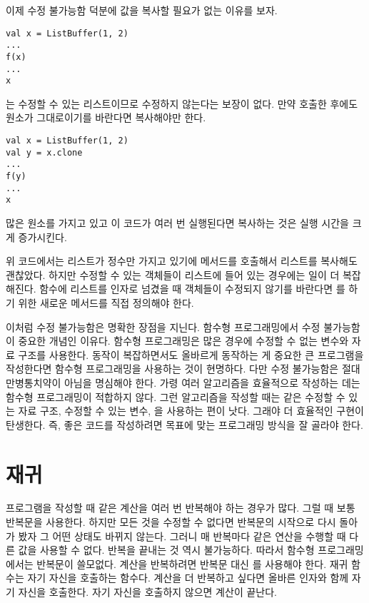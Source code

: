 이제 수정 불가능함 덕분에 값을 복사할 필요가 없는 이유를 보자.

\begin{verbatim}
val x = ListBuffer(1, 2)
...
f(x)
...
x
\end{verbatim}

는 수정할 수 있는 리스트이므로   수정하지 않는다는 보장이 없다.
만약  호출한 후에도  원소가 그대로이기를 바란다면  복사해야만 한다.

\begin{verbatim}
val x = ListBuffer(1, 2)
val y = x.clone
...
f(y)
...
x
\end{verbatim}

 많은 원소를 가지고 있고 이 코드가 여러 번 실행된다면  복사하는 것은 실행
시간을 크게 증가시킨다.

위 코드에서는 리스트가 정수만 가지고 있기에  메서드를 호출해서 리스트를
복사해도 괜찮았다. 하지만 수정할 수 있는 객체들이 리스트에 들어 있는 경우에는
일이 더 복잡해진다. 함수에 리스트를 인자로 넘겼을 때 객체들이 수정되지 않기를
바란다면 를 하기 위한 새로운 메서드를 직접 정의해야 한다.

이처럼 수정 불가능함은 명확한 장점을 지닌다. 함수형 프로그래밍에서 수정
불가능함이 중요한 개념인 이유다. 함수형 프로그래밍은 많은 경우에 수정할 수 없는
변수와 자료 구조를 사용한다. 동작이 복잡하면서도 올바르게 동작하는 게 중요한 큰
프로그램을 작성한다면 함수형 프로그래밍을 사용하는 것이 현명하다. 다만 수정
불가능함은 절대 만병통치약이 아님을 명심해야 한다. 가령 여러 알고리즘을
효율적으로 작성하는 데는 함수형 프로그래밍이 적합하지 않다. 그런 알고리즘을
작성할 때는  같은 수정할 수 있는 자료 구조, 수정할 수 있는 변수,
을 사용하는 편이 낫다. 그래야 더 효율적인 구현이 탄생한다. 즉, 좋은
코드를 작성하려면 목표에 맞는 프로그래밍 방식을 잘 골라야 한다.

\section{재귀}

프로그램을 작성할 때 같은 계산을 여러 번 반복해야 하는 경우가 많다. 그럴 때 보통
반복문을 사용한다. 하지만 모든 것을 수정할 수 없다면 반복문의 시작으로 다시
돌아가 봤자 그 어떤 상태도 바뀌지 않는다. 그러니 매 반복마다 같은 연산을 수행할
때 다른 값을 사용할 수 없다. 반복을 끝내는 것 역시 불가능하다. 따라서 함수형
프로그래밍에서는 반복문이 쓸모없다. 계산을 반복하려면 반복문 대신
를 사용해야 한다. 재귀 함수는 자기 자신을 호출하는
함수다. 계산을 더 반복하고 싶다면 올바른 인자와 함께 자기 자신을 호출한다. 자기
자신을 호출하지 않으면 계산이 끝난다.

